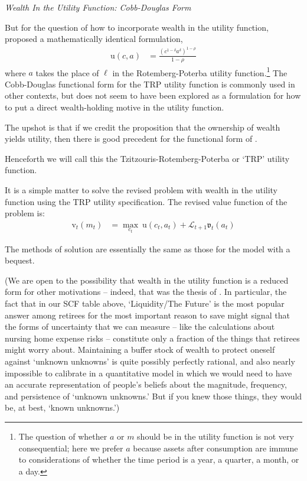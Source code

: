 \documentclass{article}
\newcommand{\CRRA}{\rho}
\newcommand{\uFunc}{\mathrm{u}}
\newcommand{\vFunc}{\mathrm{v}}
\newcommand{\Alive}{\mathcal{L}}
\newcommand{\cNrm}{c}
\newcommand{\aNrm}{a}
\newcommand{\mNrm}{m}
\newcommand{\lqdt}{\ell}
\begin{document}
\textit{Wealth In the Utility Function: Cobb-Douglas Form}

But for the question of how to incorporate wealth in the utility function, \cite{Tzitzouris_2024} proposed a mathematically identical formulation,
\begin{align}
    \uFunc(\cNrm,\aNrm) & = \frac{\left(
        \cNrm^{1-\delta}\aNrm^{\delta}
        \right)^{1-\CRRA}}{1-\CRRA}
\end{align}
where $\aNrm$ takes the place of $\lqdt$ in the Rotemberg-Poterba utility function.\footnote{The question of whether $\aNrm$ or $\mNrm$ should be in the utility function is not very consequential; here we prefer $\aNrm$ because assets after consumption are immune to considerations of whether the time period is a year, a quarter, a month, or a day.} The Cobb-Douglas functional form for the TRP utility function is commonly used in other contexts, but does not seem to have been explored as a formulation for how to put a direct wealth-holding motive in the utility function.

The upshot is that if we credit the proposition that the ownership of wealth yields utility, then there is good precedent for the functional form of \cite{Tzitzouris_2024}.


Henceforth we will call this the Tzitzouris-Rotemberg-Poterba or `TRP' utility function.

It is a simple matter to solve the revised problem with wealth in the utility function using the TRP utility specification. The revised value function of the problem is:
\begin{align}
    {\vFunc}_{t}({\mNrm}_{t}) & = \max_{\cNrm_{t}} ~ \uFunc(\cNrm_{t}, \aNrm_{t})+\Alive_{t+1}\mathfrak{v}_{t}(a_{t})
\end{align}

The methods of solution are essentially the same as those for the model with a bequest.

(We are open to the possibility that wealth in the utility function is a reduced form for other motivations -- indeed, that was the thesis of \cite{WhyDoTheRich}.  In particular, the fact that in our SCF table above, `Liquidity/The Future' is the most popular answer among retirees for the most important reason to save might signal that the forms of uncertainty that we can measure -- like the \cite{Ameriks2020jpe} calculations about nursing home expense risks -- constitute only a fraction of the things that retirees might worry about.  Maintaining a buffer stock of wealth to protect oneself against `unknown unknowns' is quite possibly perfectly rational, and also nearly impossible to calibrate in a quantitative model in which we would need to have an accurate representation of people's beliefs about the magnitude, frequency, and persistence of `unknown unknowns.'  But if you knew those things, they would be, at best, `known unknowns.')
\end{document}
